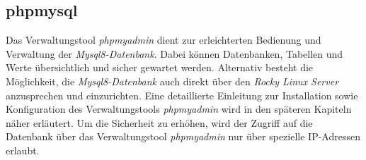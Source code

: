 \subsection{phpmysql}
Das Verwaltungstool \textit{phpmyadmin} dient zur erleichterten Bedienung und Verwaltung der \textit{Mysql8-Datenbank}.
Dabei können Datenbanken, Tabellen und Werte übersichtlich und sicher gewartet werden.
Alternativ besteht die Möglichkeit, die \textit{Mysql8-Datenbank} auch direkt über den \textit{Rocky Linux Server} anzusprechen und einzurichten.
Eine detaillierte Einleitung zur Installation sowie Konfiguration des Verwaltungstools \textit{phpmyadmin} wird in den späteren Kapiteln näher erläutert.
Um die Sicherheit zu erhöhen, wird der Zugriff auf die Datenbank über das Verwaltungstool \textit{phpmyadmin} nur über spezielle IP-Adressen erlaubt.


